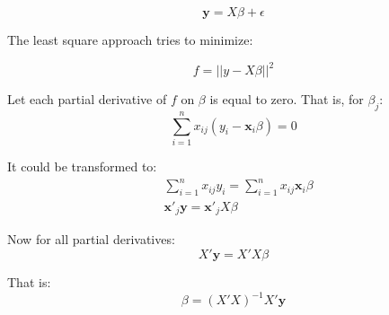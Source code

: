 \documentclass{article}
\begin{document}
\begin{equation}
\mathbf{y}=X\beta + \epsilon
\end{equation}

The least square approach tries to minimize:

\begin{equation}
f=||y-X\beta||^2
\end{equation}

Let each partial derivative of \(f\) on \(\beta\) is equal to zero. That is,
for \(\beta_j\):
\begin{equation}
\sum_{i=1}^nx_{ij}(y_i-\mathbf{x}_i\beta)=0
\end{equation}

It could be transformed to:
\begin{equation}
\begin{split}
&\sum_{i=1}^nx_{ij}y_i=\sum_{i=1}^nx_{ij}\mathbf{x}_i\beta\\
&\mathbf{x}'_j\mathbf{y}=\mathbf{x}'_jX\beta
\end{split}
\end{equation}

Now for all partial derivatives:
\begin{equation}
X'\mathbf{y}=X'X\beta
\end{equation}

That is:
\begin{equation}
\beta=(X'X)^{-1}X'\mathbf{y}
\end{equation}
\end{document}
